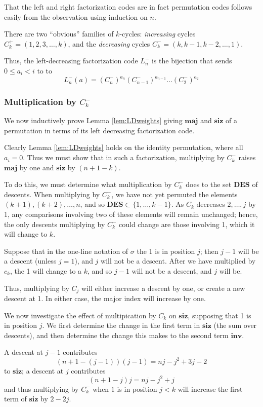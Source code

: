 \documentclass{amsart}[12pt]
\theoremstyle{definition}
\newcommand{\inv}{\mathbf{inv}}
\newcommand{\DES}{\mathbf{DES}}
\newcommand{\maj}{\mathbf{maj}}
\newcommand{\siz}{\mathbf{siz}}
\begin{document}
That the left and right factorization codes are in fact permutation codes follows easily from the observation using induction on $n$.

There are two ``obvious'' families of $k$-cycles:  \emph{increasing} cycles $C^+_k=(1,2,3,\dots,k)$, and the \emph{decreasing} cycles $C^-_k=(k,k-1,k-2,\dots,1)$.  

Thus, the left-decreasing factorization code $L^-_n$ is the bijection that sends $0\leq a_i<i$ to to 
$$L^-_n(a)=(C_n^-)^{a_n}(C_{n-1}^-)^{a_{n-1}}\dots (C_2^-)^{a_2}$$


\subsubsection{Multiplication by $C_k^-$} \label{sec:factorizationinductuction}

We now inductively prove Lemma \ref{lem:LDweights} giving $\maj$ and $\siz$ of a permutation in terms of its left decreasing factorization code.

Clearly Lemma \ref{lem:LDweights} holds on the identity permutation, where all $a_i=0$.   Thus we must show that in such a factorization, multiplying by $C^-_k$ raises $\maj$ by one and $\siz$ by $(n+1-k)$.

To do this, we must determine what multiplication by $C_k^-$ does to the set $\DES$ of descents.  When multiplying by $C^-_k$, we have not yet permuted the elements $(k+1), (k+2),\dots, n$, and so $\DES\subset \{1,\dots, k-1\}$. As $C_k$ decreases $2,\dots, j$ by 1, any comparisons involving two of these elements will remain unchanged; hence, the only descents multiplying by $C^-_k$ could change are those involving 1, which it will change to $k$.

Suppose that in the one-line notation of $\sigma$ the 1 is in position $j$; then $j-1$ will be a descent (unless $j=1$), and $j$ will not be a descent.  After we have multiplied by $c_k$, the 1 will change to a $k$, and so $j-1$ will not be a descent, and $j$ will be.

Thus, multiplying by $C_j$ will either increase a descent by one, or create a new descent at 1.  In either case, the major index will increase by one.

We now investigate the effect of multipication by $C_k$ on $\siz$, supposing that 1 is in position $j$.  We first determine the change in the first term in $\siz$ (the sum over descents), and then determine the change this makes to the second term $\inv$.

A descent at $j-1$ contributes $$(n+1-(j-1))(j-1)=nj-j^2+3j-2$$ to $\siz$; a descent at $j$ contributes $$(n+1-j)j=nj-j^2+j$$
and thus multiplying by $C_k^-$ when $1$ is in position $j<k$ will increase the first term of $\siz$ by $2-2j$.
\end{document}

